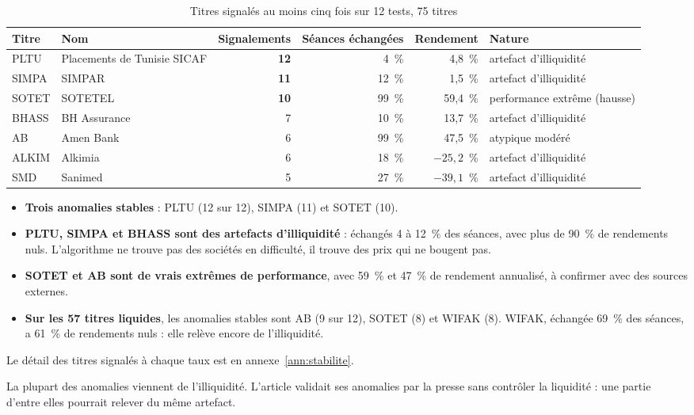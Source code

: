 \documentclass[11pt,a4paper]{article}
\newcommand{\pc}{~\%}
\begin{document}
\begin{table}[H]\centering\small
\caption{Titres signalés au moins cinq fois sur 12 tests, 75 titres}\label{tab:anomalies}
\begin{tabular}{llrrrl}\toprule
Titre & Nom & Signalements & Séances échangées & Rendement & Nature \\ \midrule
PLTU & Placements de Tunisie SICAF & \textbf{12} & 4\pc{} & 4,8\pc{} & artefact d'illiquidité \\
SIMPA & SIMPAR & \textbf{11} & 12\pc{} & 1,5\pc{} & artefact d'illiquidité \\
SOTET & SOTETEL & \textbf{10} & 99\pc{} & 59,4\pc{} & performance extrême (hausse) \\
BHASS & BH Assurance & 7 & 10\pc{} & 13,7\pc{} & artefact d'illiquidité \\
AB & Amen Bank & 6 & 99\pc{} & 47,5\pc{} & atypique modéré \\
ALKIM & Alkimia & 6 & 18\pc{} & $-25{,}2$\pc{} & artefact d'illiquidité \\
SMD & Sanimed & 5 & 27\pc{} & $-39{,}1$\pc{} & artefact d'illiquidité \\
\bottomrule\end{tabular}
\end{table}

\begin{itemize}
  \item \textbf{Trois anomalies stables} : PLTU (12 sur 12), SIMPA (11) et SOTET (10).
  \item \textbf{PLTU, SIMPA et BHASS sont des artefacts d'illiquidité} : échangés 4 à 12\pc{} des séances, avec plus de 90\pc{} de rendements nuls. L'algorithme ne trouve pas des sociétés en difficulté, il trouve des prix qui ne bougent pas.
  \item \textbf{SOTET et AB sont de vrais extrêmes de performance}, avec 59\pc{} et 47\pc{} de rendement annualisé, à confirmer avec des sources externes.
  \item \textbf{Sur les 57 titres liquides}, les anomalies stables sont AB (9 sur 12), SOTET (8) et WIFAK (8). WIFAK, échangée 69\pc{} des séances, a 61\pc{} de rendements nuls : elle relève encore de l'illiquidité.
\end{itemize}
Le détail des titres signalés à chaque taux est en annexe~\ref{ann:stabilite}.

\begin{retenir}
La plupart des anomalies viennent de l'illiquidité. L'article validait ses anomalies par la presse sans contrôler la liquidité : une partie d'entre elles pourrait relever du même artefact.
\end{retenir}
\end{document}
